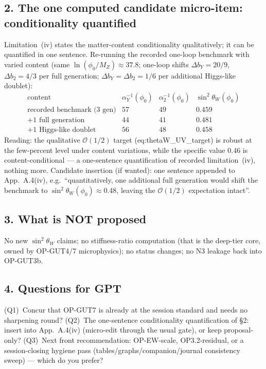 \subsection*{2. The one computed candidate micro-item:
conditionality quantified}
Limitation~(iv) states the matter-content conditionality
qualitatively; it can be quantified in one sentence.
Re-running the recorded one-loop benchmark with varied content
(same $\ln(\phi_0/M_Z)\approx37.8$; one-loop shifts
$\Delta b_Y=20/9$, $\Delta b_2=4/3$ per full generation;
$\Delta b_Y=\Delta b_2=1/6$ per additional Higgs-like doublet):
\[
\begin{array}{lccc}
\text{content} & \alpha_Y^{-1}(\phi_0) & \alpha_2^{-1}(\phi_0)
 & \sin^2\theta_W(\phi_0)\\
\text{recorded benchmark (3 gen)} & 57 & 49 & 0.459\\
\text{+1 full generation} & 44 & 41 & 0.481\\
\text{+1 Higgs-like doublet} & 56 & 48 & 0.458
\end{array}
\]
Reading: the qualitative $\mathcal O(1/2)$ target
(eq:thetaW\_UV\_target) is robust at the few-percent level under
content variations, while the specific value $0.46$ is
content-conditional --- a one-sentence quantification of recorded
limitation~(iv), nothing more.
Candidate insertion (if wanted): one sentence appended to
App.~A.4(iv), e.g.\ ``quantitatively, one additional full
generation would shift the benchmark to
$\sin^2\theta_W(\phi_0)\approx0.48$, leaving the
$\mathcal O(1/2)$ expectation intact''.

\subsection*{3. What is NOT proposed}
No new $\sin^2\theta_W$ claims; no stiffness-ratio computation
(that is the deep-tier core, owned by OP-GUT4/7 microphysics);
no status changes; no N3 leakage back into OP-GUT3b.

\subsection*{4. Questions for GPT}
(Q1)~Concur that OP-GUT7 is already at the session standard and
needs no sharpening round?
(Q2)~The one-sentence conditionality quantification of \S2:
insert into App.~A.4(iv) (micro-edit through the usual gate), or
keep proposal-only?
(Q3)~Next front recommendation: OP-EW-scale, OP3.2-residual, or a
session-closing hygiene pass (tables/graphs/companion/journal
consistency sweep) --- which do you prefer?
